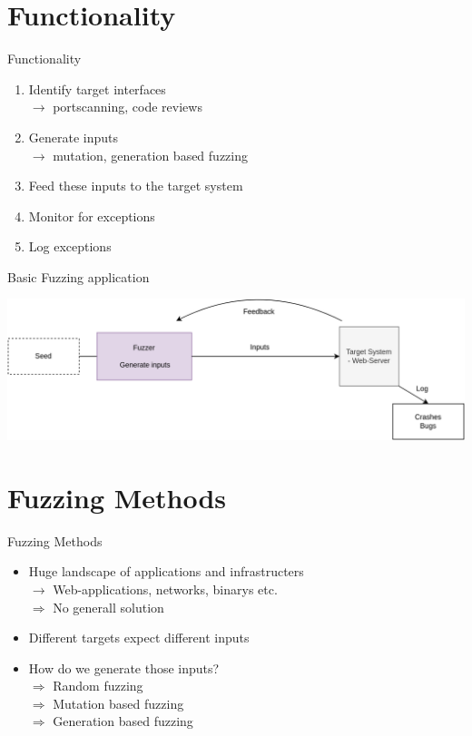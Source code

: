 \documentclass{beamer}
\begin{document}
\section{Functionality}
\begin{frame}{Functionality}
\begin{enumerate}
 \item Identify target interfaces\\
 $\rightarrow$ portscanning, code reviews
 \item Generate inputs\\
 $\rightarrow$ mutation, generation based fuzzing
 \item Feed these inputs to the target system
 \item Monitor for exceptions
 \item Log exceptions
\end{enumerate}

\end{frame}
\begin{frame}{Basic Fuzzing application}
\begin{center}
  \includegraphics[scale=0.15]{basicfuzz.png}
\end{center}
\end{frame}
\section{Fuzzing Methods}
\begin{frame}{Fuzzing Methods}
 \begin{itemize}
  \item Huge landscape of applications and infrastructers\\
  $\rightarrow$ Web-applications, networks, binarys etc.\\
  $\Rightarrow$ No generall solution
  \item Different targets expect different inputs
  \item How do we generate those inputs?\\
  $\Rightarrow$ Random fuzzing\\
  $\Rightarrow$ Mutation based fuzzing\\
  $\Rightarrow$ Generation based fuzzing
 \end{itemize}

\end{frame}
\end{document}
